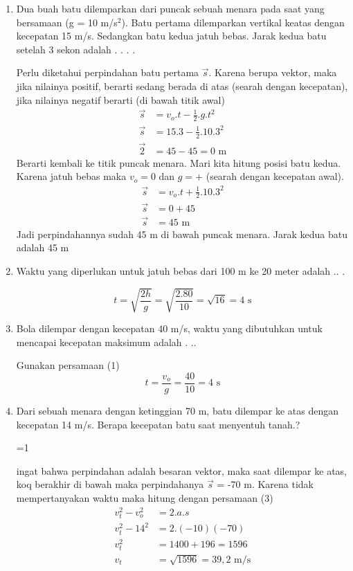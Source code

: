 \documentclass[10pt,a4paper]{article}
\def\tampilkunci{1}
\newcommand{\hide}[1]{\ifnum\tampilkunci=1
%
\begin{mybox}
 #1
\end{mybox}
%
\fi}
\newcommand{\unhide}[1]{
\begin{mybox}
#1\end{mybox}}
\begin{document}
\begin{multicols*}{2}
\begin{enumerate}[topsep=0pt,itemsep=0pt,leftmargin=*]
\item Dua buah batu dilemparkan dari puncak sebuah menara pada saat yang bersamaan (g = 10 m/s$^2$). Batu pertama dilemparkan vertikal keatas dengan kecepatan 15 m/s. Sedangkan batu kedua jatuh bebas. Jarak kedua batu setelah 3 sekon adalah . . . .
\unhide{
Perlu diketahui perpindahan batu pertama $\vec{s}$. Karena berupa vektor, maka jika nilainya positif, berarti sedang berada di atas (searah dengan kecepatan), jika nilainya negatif berarti (di bawah titik awal)
\begin{align*}
\vec{s} &= v_o.t-\frac{1}{2}.g.t^2\\
\vec{s} &= 15.3 - \frac{1}{2}.10.3^2\\
\vec{2} &=45-45 =0 \text{ m}
\end{align*} 
Berarti kembali ke titik puncak menara. Mari kita hitung posisi batu kedua. Karena jatuh bebas maka $v_o=0$ dan $g=+$ (searah dengan kecepatan awal). 
\begin{align*}
\vec{s} &= v_o.t+\frac{1}{2}.10.3^2\\
\vec{s} &= 0 + 45\\
\vec{s} &= 45 \text{ m}
\end{align*}
Jadi perpindahannya sudah 45 m di bawah puncak menara. Jarak kedua batu adalah 45 m
}

\item Waktu yang diperlukan untuk jatuh bebas dari 100 m ke 20 meter adalah .. .
\unhide{
$$t=\sqrt{\frac{2h}{g}}=\sqrt{\frac{2.80}{10}}=\sqrt{16} = 4 \text{ s}$$}

\item Bola dilempar dengan kecepatan 40 m/s, waktu yang dibutuhkan untuk mencapai kecepatan maksimum adalah . .. 
\unhide{
Gunakan persamaan (1)
$$t=\frac{v_o}{g} = \frac{40}{10}=4\text{ s}$$}

\item Dari sebuah menara dengan ketinggian 70 m, batu dilempar ke atas dengan kecepatan 14 m/s. Berapa kecepatan batu saat menyentuh tanah.?

\hide{ ingat bahwa perpindahan adalah besaran vektor, maka saat dilempar ke atas, koq berakhir di bawah maka perpindahanya $\vec{s}$ = -70 m. Karena tidak mempertanyakan waktu maka hitung dengan persamaan (3)
\begin{align*}
v_t^2 - v_o^2 &= 2.a.s\\
v_t^2 - 14^2 &= 2.(-10)(-70)\\
v_t^2 &= 1400+196 = 1596 \\
v_t &= \sqrt {1596} = 39,2 \text{ m/s}
\end{align*}}


\end{enumerate}


\end{multicols*}


 
\end{document}
